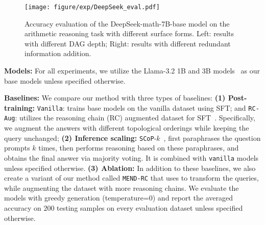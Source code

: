 \begin{figure}[t ]
    \centering
    \texttt{[image: figure/exp/DeepSeek\_eval.pdf]}
    \caption{Accuracy evaluation of the DeepSeek-math-7B-base model on the arithmetic reasoning task with different surface forms. Left: results with different DAG depth; Right: results with different redundant information addition.}
    \label{fig: mathstral_evaluation}
    \vspace{-4mm}
\end{figure}

\textbf{Models:} For all experiments, we utilize the Llama-3.2 1B and 3B models~\citep{dubey2024llama3} as our base models unless specified otherwise.

\textbf{Baselines:} We compare our method with three types of baselines: \textbf{(1) Post-training:} \texttt{Vanilla}: trains base models on the vanilla dataset using SFT; and \texttt{RC-Aug}: utilizes the reasoning chain (RC) augmented dataset for SFT~\citep{yu2023metamath}. Specifically, we augment the answers with different topological orderings while keeping the query unchanged; \textbf{(2) Inference scaling:} \texttt{SCoP}-$k$~\citep{zhou2024paraphrase}, first paraphrases the question prompts $k$ times, then performs reasoning based on these paraphrases, and obtains the final answer via majority voting. It is combined with \texttt{vanilla} models unless specified otherwise. \textbf{(3) Ablation:} In addition to these baselines, we also create a variant of our method called \texttt{MEND-RC} that uses \texttt{\method} to transform the queries, while augmenting the dataset with more reasoning chains. We evaluate the models with greedy generation (temperature=$0$) and report the averaged accuracy on $200$ testing samples on every evaluation dataset unless specified otherwise.



% 
% 

